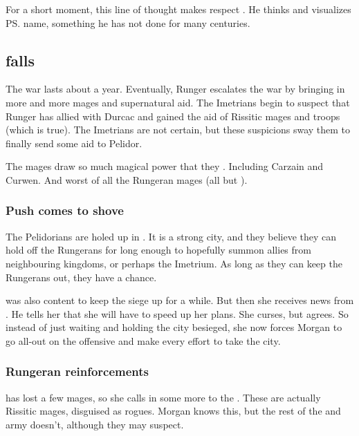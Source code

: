 For a short moment, this line of thought makes \Secherdamon{} respect \Ishnaruchaefir{}. 
He thinks and visualizes \ps{\Ishnaruchaefir} name, something he has not done for many centuries. 












\subsection{\Forclin falls}
The war lasts about a year. Eventually, Runger escalates the war by bringing in more and more mages and supernatural aid. 
The Imetrians begin to suspect that Runger has allied with Durcac and gained the aid of Rissitic mages and troops (which is true). 
The Imetrians are not certain, but these suspicions sway them to finally send some aid to Pelidor. 

The mages draw so much magical power that they . 
Including Carzain and Curwen. 
And worst of all the Rungeran mages (all but \Takestsha). 





\subsubsection{Push comes to shove}
The Pelidorians are holed up in \Forclin. 
It is a strong city, and they believe they can hold off the Rungerans for long enough to hopefully summon allies from neighbouring kingdoms, or perhaps the Imetrium. 
As long as they can keep the Rungerans out, they have a chance. 

\Takestsha{} was also content to keep the siege up for a while. 
But then she receives news from \LocarPsyrex. 
He tells her that she will have to speed up her plans. 
She curses, but agrees. 
So instead of just waiting and holding the city besieged, she now forces Morgan to go all-out on the offensive and make every effort to take the city. 





\subsubsection{Rungeran reinforcements}
\Takestsha{} has lost a few mages, so she calls in some more  to the \ishrah. 
These are actually Rissitic mages, disguised as rogues. 
Morgan knows this, but the rest of the \ishrah{} and army doesn't, although they may suspect. 

